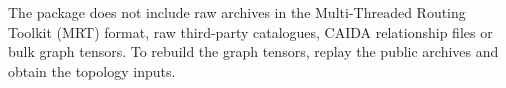 
The package does not include raw archives in the Multi-Threaded Routing Toolkit (MRT) format, raw third-party catalogues, CAIDA relationship files or bulk graph tensors.
To rebuild the graph tensors, replay the public archives and obtain the topology inputs.

